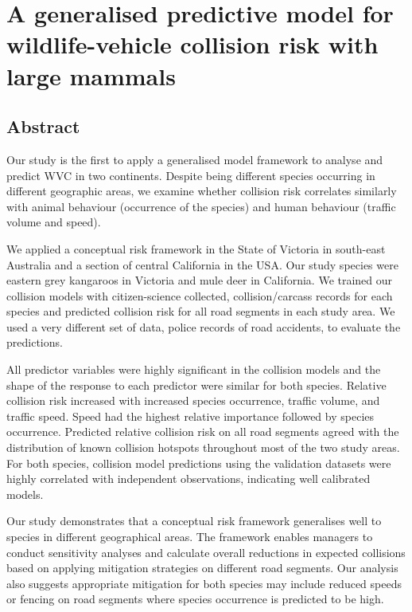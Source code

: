 \chapter{A generalised predictive model for wildlife-vehicle collision risk with large mammals}\label{sec:cal}
\newpage

\begin{localsize}{11}
\section*{\centering Abstract}

Our study is the first to apply a generalised model framework to analyse and predict WVC in two continents. Despite being different species occurring in different geographic areas, we examine whether collision risk correlates similarly with animal behaviour (occurrence of the species) and human behaviour (traffic volume and speed).

We applied a conceptual risk framework in the State of Victoria in south-east Australia and a section of central California in the USA. Our study species were eastern grey kangaroos in Victoria and mule deer in California. We trained our collision models with citizen-science collected, collision/carcass records for each species and predicted collision risk for all road segments in each study area.  We used a very different set of data, police records of road accidents, to evaluate the predictions.

All predictor variables were highly significant in the collision models and the shape of the response to each predictor were similar for both species.  Relative collision risk increased with increased species occurrence, traffic volume, and traffic speed. Speed had the highest relative importance followed by species occurrence. Predicted relative collision risk on all road segments agreed with the distribution of known collision hotspots throughout most of the two study areas. For both species, collision model predictions using the validation datasets were highly correlated with independent observations, indicating well calibrated models.

Our study demonstrates that a conceptual risk framework generalises well to species in different geographical areas. The framework enables managers to conduct sensitivity analyses and calculate overall reductions in expected collisions based on applying mitigation strategies on different road segments. Our analysis also suggests appropriate mitigation for both species may include reduced speeds or fencing on road segments where species occurrence is predicted to be high.

\end{localsize}

